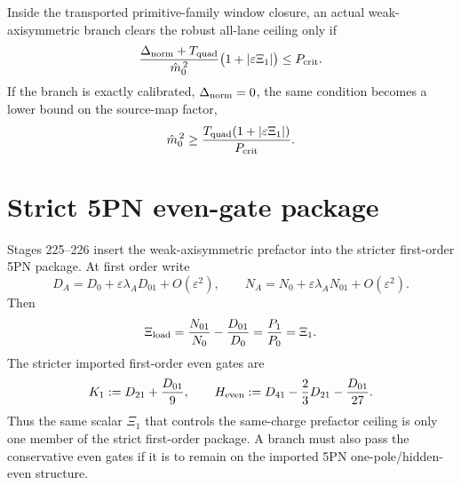 \begin{theorem}
\label{thm:part07-actual-branch-ceiling}
Inside the transported primitive-family window closure, an actual weak-axisymmetric branch clears the robust all-lane ceiling only if
\begin{equation}
\label{eq:part07-thm-ceiling}
\frac{\Delta_{\rm norm}+T_{\rm quad}}{\hat m_0^{\,2}}
\bigl(1+|\varepsilon\Xi_1|\bigr)
\le P_{\rm crit}.
\end{equation}
If the branch is exactly calibrated, \(\Delta_{\rm norm}=0\), the same condition becomes a lower bound on the source-map factor,
\begin{equation}
\label{eq:part07-source-map-bound}
\hat m_0^{\,2}
\ge
\frac{T_{\rm quad}(1+|\varepsilon\Xi_1|)}{P_{\rm crit}}.
\end{equation}
\end{theorem}


\section{Strict 5PN even-gate package}
\label{sec:part07_same_charge_rigid_mouth:strict-5-pn-even-gate-package}

Stages 225--226 insert the weak-axisymmetric prefactor into the stricter first-order 5PN package.  At first order write
\begin{equation}
\label{eq:part07-first-order-d-n}
D_A=D_0+\varepsilon\lambda_A D_{01}+O(\varepsilon^2),
\qquad
N_A=N_0+\varepsilon\lambda_A N_{01}+O(\varepsilon^2).
\end{equation}
Then
\begin{equation}
\label{eq:part07-xi-load}
\Xi_{\rm load}
=
\frac{N_{01}}{N_0}-\frac{D_{01}}{D_0}
=
\frac{P_1}{P_0}
=
\Xi_1.
\end{equation}
The stricter imported first-order even gates are
\begin{equation}
\label{eq:part07-even-gates}
K_1:=D_{21}+\frac{D_{01}}{9},
\qquad
H_{\rm even}:=D_{41}-\frac23D_{21}-\frac{D_{01}}{27}.
\end{equation}
Thus the same scalar \(\Xi_1\) that controls the same-charge prefactor ceiling is only one member of the strict first-order package.  A branch must also pass the conservative even gates if it is to remain on the imported 5PN one-pole/hidden-even structure.


